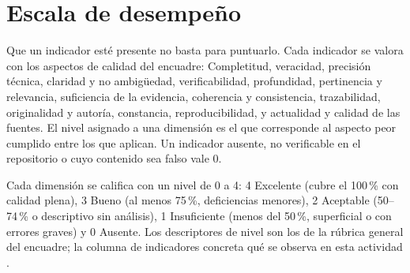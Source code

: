 \documentclass[11pt]{article}
\newcommand{\seccion}[1]{\section{\textcolor{utegreendk}{#1}}}
\begin{document}
\seccion{Escala de desempeño}

\begin{cajaclave}[title={La presencia no basta: se califica la calidad}]
	Que un indicador esté presente no basta para puntuarlo. Cada indicador se valora con los aspectos de calidad del encuadre: Completitud, veracidad, precisión técnica, claridad y no ambigüedad, verificabilidad, profundidad, pertinencia y relevancia, suficiencia de la evidencia, coherencia y consistencia, trazabilidad, originalidad y autoría, constancia, reproducibilidad, y actualidad y calidad de las fuentes. El nivel asignado a una dimensión es el que corresponde al aspecto peor cumplido entre los que aplican. Un indicador ausente, no verificable en el repositorio o cuyo contenido sea falso vale 0.
\end{cajaclave}

Cada dimensión se califica con un nivel de 0 a 4: 4 Excelente (cubre el 100\,\% con calidad plena), 3 Bueno (al menos 75\,\%, deficiencias menores), 2 Aceptable (50--74\,\% o descriptivo sin análisis), 1 Insuficiente (menos del 50\,\%, superficial o con errores graves) y 0 Ausente. Los descriptores de nivel son los de la rúbrica general del encuadre; la columna de indicadores concreta qué se observa en esta actividad \citep{brookhart_2018,panadero_jonsson_2020}.
\end{document}
